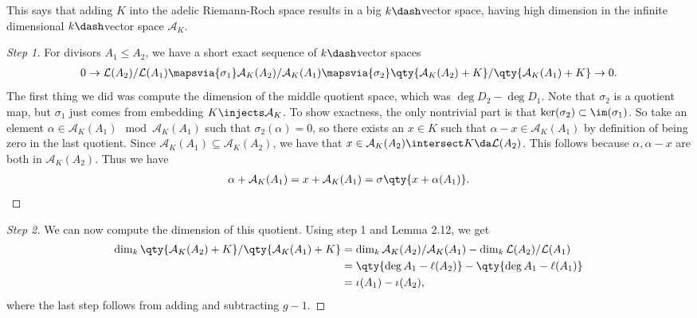 \begin{remark}

This says that adding \(K\) into the adelic Riemann-Roch space results
in a big \(k\dash\)vector space, having high dimension in the infinite
dimensional \(k\dash\)vector space \(\mathcal{A}_K\).

\end{remark}

\begin{proof}[Step 1]

For divisors \(A_1 \leq A_2\), we have a short exact sequence of
\(k\dash\)vector spaces
\begin{align*}  
0 \to \mathcal{L}(A_2) / \mathcal{L}(A_1) \mapsvia{\sigma_1} \mathcal{A}_K(A_2) / \mathcal{A}_K(A_1) \mapsvia{\sigma_2} \qty{\mathcal{A}_K(A_2) + K} / \qty{\mathcal{A}_K(A_1) + K } \to 0
.\end{align*} The first thing we did was compute the dimension of the
middle quotient space, which was \(\deg D_2 - \deg D_1\). Note that
\(\sigma_2\) is a quotient map, but \(\sigma_1\) just comes from
embedding \(K\injects \mathcal{A}_K\). To show exactness, the only
nontrivial part is that \(\ker(\sigma_2) \subset \im(\sigma_1)\). So
take an element \(\alpha\in \mathcal{A}_K(A_1) \mod \mathcal{A}_K(A_1)\)
such that \(\sigma_2(\alpha) = 0\), so there exists an \(x\in K\) such
that \(\alpha-x \in \mathcal{A}_K(A_1)\) by definition of being zero in
the last quotient. Since
\(\mathcal{A}_K(A_1) \subseteq \mathcal{A}_K(A_2)\), we have that
\(x\in \mathcal{A}_K(A_2) \intersect K \da \mathcal{L}(A_2)\). This
follows because \(\alpha, \alpha-x\) are both in \(\mathcal{A}_K(A_2)\).
Thus we have
\begin{align*}  
\alpha + \mathcal{A}_K(A_1) = x + \mathcal{A}_K(A_1) = \sigma\qty{x + \alpha(A_1)}
.\end{align*}

\end{proof}

\begin{proof}[Step 2]

We can now compute the dimension of this quotient. Using step 1 and
Lemma 2.12, we get
\begin{align*}  
\dim_k\qty{ \mathcal{A}_K(A_2) + K } / \qty{ \mathcal{A}_K(A_1) + K }
&= \dim_k \mathcal{A}_K(A_2) / \mathcal{A}_K(A_1) - \dim_k \mathcal{L}(A_2) / \mathcal{L}(A_1) \\
&= \qty{\deg A_1 - \ell(A_2) } - \qty{\deg A_1 - \ell(A_1) } \\
&= \iota(A_1) - \iota(A_2)
,\end{align*} where the last step follows from adding and subtracting
\(g-1\).

\end{proof}

